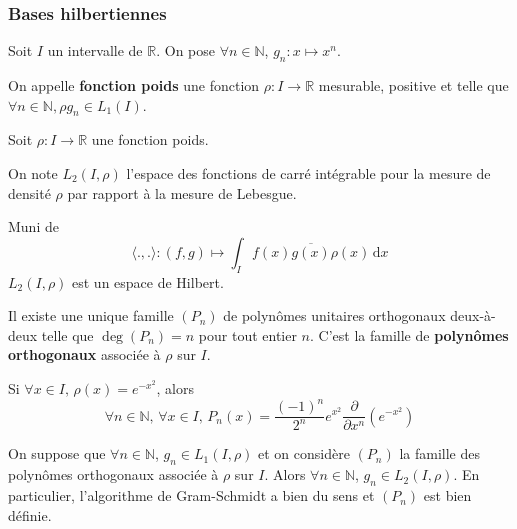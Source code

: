   \subsubsection{Bases hilbertiennes}


  Soit $I$ un intervalle de $\mathbb{R}$. On pose $\forall n \in \mathbb{N}$, $g_n : x \mapsto x^n$.

  \begin{definition}
    On appelle \textbf{fonction poids} une fonction $\rho : I \rightarrow \mathbb{R}$ mesurable, positive et telle que $\forall n \in \mathbb{N}, \rho g_n \in L_1(I)$.
  \end{definition}

  Soit $\rho : I \rightarrow \mathbb{R}$ une fonction poids.

  \begin{notation}
    On note $L_2(I, \rho)$ l'espace des fonctions de carré intégrable pour la mesure de densité $\rho$ par rapport à la mesure de Lebesgue.
  \end{notation}

  \begin{proposition}
    Muni de
    \[ \langle ., . \rangle : (f,g) \mapsto \int_I f(x) \overline{g(x)} \rho(x) \, \mathrm{d}x \]
    $L_2(I, \rho)$ est un espace de Hilbert.
  \end{proposition}

  \begin{theorem}
    Il existe une unique famille $(P_n)$ de polynômes unitaires orthogonaux deux-à-deux telle que $\deg(P_n) = n$ pour tout entier $n$. C'est la famille de \textbf{polynômes orthogonaux} associée à $\rho$ sur $I$.
  \end{theorem}

  \begin{example}
    Si $\forall x \in I, \, \rho(x) = e^{-x^2}$, alors
    \[ \forall n \in \mathbb{N}, \, \forall x \in I, \, P_n(x) = \frac{(-1)^n}{2^n} e^{x^2} \frac{\partial}{\partial x^n} \left( e^{-x^2} \right) \]
  \end{example}


  \begin{lemma}
    On suppose que $\forall n \in \mathbb{N}$, $g_n \in L_1(I, \rho)$ et on considère $(P_n)$ la famille des polynômes orthogonaux associée à $\rho$ sur $I$. Alors $\forall n \in \mathbb{N}$, $g_n \in L_2(I, \rho)$. En particulier, l'algorithme de Gram-Schmidt a bien du sens et $(P_n)$ est bien définie.
  \end{lemma}

